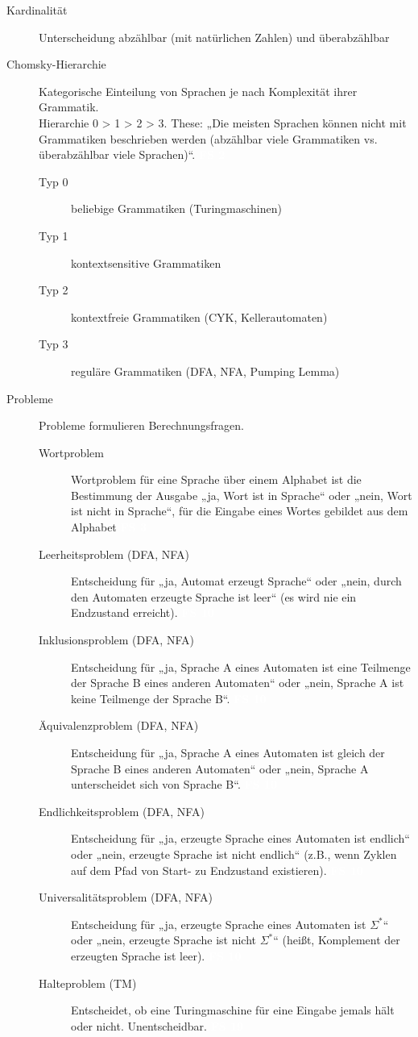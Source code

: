 \documentclass[a4paper,10pt]{article}
\newcommand{\vl}[1]{\colorbox{vl}{\textcolor{white}{\small\textbf{#1}}}}
\begin{document}
\begin{description}
        \item[Kardinalität] Unterscheidung abzählbar (mit natürlichen Zahlen) und überabzählbar

        \item[Chomsky-Hierarchie]
            Kategorische Einteilung von Sprachen je nach Komplexität ihrer Grammatik. \\
            Hierarchie 0 > 1 > 2 > 3.
            These: „Die meisten Sprachen können nicht mit Grammatiken beschrieben
            werden (abzählbar viele Grammatiken vs. überabzählbar viele Sprachen)“. \vl{FS 2}
            \begin{description}
                \item[Typ 0] beliebige Grammatiken (Turingmaschinen)
                \item[Typ 1] kontextsensitive Grammatiken
                \item[Typ 2] kontextfreie Grammatiken (CYK, Kellerautomaten)
                \item[Typ 3] reguläre Grammatiken (DFA, NFA, Pumping Lemma)
            \end{description}

        \item[Probleme] Probleme formulieren Berechnungsfragen.
            \begin{description}
                \item[Wortproblem] Wortproblem für eine Sprache über einem Alphabet ist die Bestimmung der Ausgabe „ja, Wort ist in Sprache“ oder „nein, Wort ist nicht in Sprache“, für die Eingabe eines Wortes gebildet aus dem Alphabet \vl{FS 3}
                \item[Leerheitsproblem (DFA, NFA)] Entscheidung für „ja, Automat erzeugt Sprache“ oder „nein, durch den Automaten erzeugte Sprache ist leer“ (es wird nie ein Endzustand erreicht). \vl{FS 10}
                \item[Inklusionsproblem (DFA, NFA)] Entscheidung für „ja, Sprache A eines Automaten ist eine Teilmenge der Sprache B eines anderen Automaten“ oder „nein, Sprache A ist keine Teilmenge der Sprache B“. \vl{FS 10}
                \item[Äquivalenzproblem (DFA, NFA)] Entscheidung für „ja, Sprache A eines Automaten ist gleich der Sprache B eines anderen Automaten“ oder „nein, Sprache A unterscheidet sich von Sprache B“. \vl{FS 10}
                \item[Endlichkeitsproblem (DFA, NFA)] Entscheidung für „ja, erzeugte Sprache eines Automaten ist endlich“ oder „nein, erzeugte Sprache ist nicht endlich“ (z.B., wenn Zyklen auf dem Pfad von Start- zu Endzustand existieren). \vl{FS 10}
                \item[Universalitätsproblem (DFA, NFA)] Entscheidung für „ja, erzeugte Sprache eines Automaten ist $\Sigma^*$“ oder „nein, erzeugte Sprache ist nicht $\Sigma^*$“ (heißt, Komplement der erzeugten Sprache ist leer). \vl{FS 10}
                \item[Halteproblem (TM)] Entscheidet, ob eine Turingmaschine für eine Eingabe jemals hält oder nicht. Unentscheidbar. \vl{FS 19}
            \end{description}


\end{description}
\end{document}
